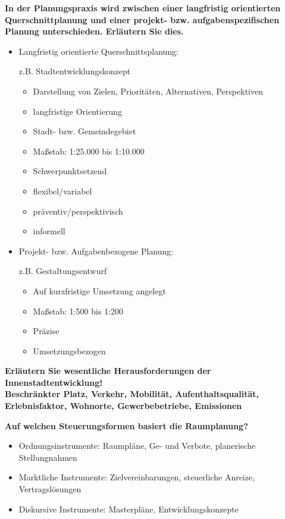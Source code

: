 \documentclass[]{article}
\newenvironment{question}{\vspace{8mm}\noindent\bfseries}{\\}
\begin{document}
\begin{question}
	In der Planungspraxis wird zwischen einer langfristig orientierten Querschnittplanung und einer projekt- bzw. aufgabenspezifischen Planung unterschieden. Erläutern Sie dies.
\end{question}
\begin{itemize}
	\item Langfristig orientierte Querschnittsplanung:
	
	z.B. Stadtentwicklungskonzept
	
	\begin{itemize}
		\item Darstellung von Zielen, Prioritäten, Alternativen, Perspektiven
		\item langfristige Orientierung
		\item Stadt- bzw. Gemeindegebiet
		\item Maßstab: 1:25.000 bis 1:10.000
		\item Schwerpunktsetzend
		\item flexibel/variabel
		\item präventiv/perspektivisch
		\item informell
	\end{itemize}

	\item Projekt- bzw. Aufgabenbezogene Planung:
	
	z.B. Gestaltungsentwurf
	
	\begin{itemize}
		\item Auf kurzfristige Umsetzung angelegt
		\item Maßstab: 1:500 bis 1:200
		\item Präzise
		\item Umsetzungsbezogen
	\end{itemize}
\end{itemize}


\begin{question}
	Erläutern Sie wesentliche Herausforderungen der Innenstadtentwicklung!
\end{question}
Beschränkter Platz, Verkehr, Mobilität, Aufenthaltsqualität, Erlebnisfaktor, Wohnorte, Gewerbebetriebe, Emissionen


\begin{question}
	Auf welchen Steuerungsformen basiert die Raumplanung?
\end{question}
\begin{itemize}
	\item Ordnungsinstrumente: Raumpläne, Ge- und Verbote, planerische Stellungnahmen
	\item Marktliche Instrumente: Zielvereinbarungen, steuerliche Anreize, Vertragslösungen
	\item Diskursive Instrumente: Masterpläne, Entwicklungskonzepte
\end{itemize}
\end{document}
